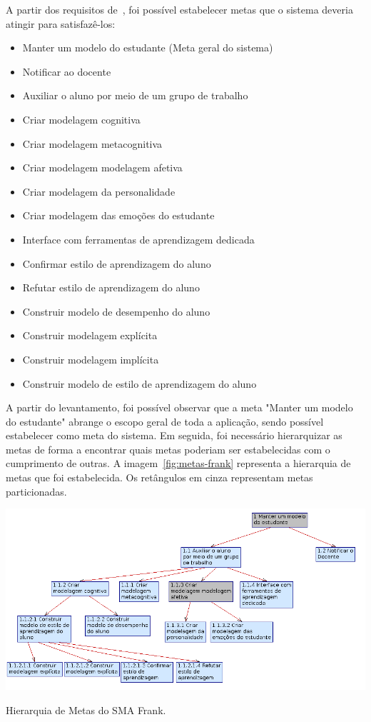 A partir dos requisitos de~\cite{editalFrank}, foi possível estabelecer metas que o sistema deveria atingir para satisfazê-los:

\begin{itemize}
	\item Manter um modelo do estudante (Meta geral do sistema)
	\item Notificar ao docente
	\item Auxiliar o aluno por meio de um grupo de trabalho
	\item Criar modelagem cognitiva
	\item Criar modelagem metacognitiva
	\item Criar modelagem modelagem afetiva
	\item Criar modelagem da personalidade
	\item Criar modelagem das emoções do estudante
	\item Interface com ferramentas de aprendizagem dedicada
	\item Confirmar estilo de aprendizagem do aluno
	\item Refutar estilo de aprendizagem do aluno
	\item Construir modelo de desempenho do aluno
	\item Construir modelagem explícita
	\item Construir modelagem implícita
	\item Construir modelo de estilo de aprendizagem do aluno
\end{itemize}

A partir do levantamento, foi possível observar que a meta "Manter um modelo do estudante" abrange o escopo geral de toda a aplicação, sendo possível estabelecer como meta do sistema. Em seguida, foi necessário hierarquizar as metas de forma a encontrar quais metas poderiam ser estabelecidas com o cumprimento de outras. A imagem~\ref{fig:metas-frank} representa a hierarquia de metas que foi estabelecida. Os retângulos em cinza representam metas particionadas.

\begin{table}
	\centering
	\includegraphics[scale=0.8]{images/metas-frank.png}
	\caption{Hierarquia de Metas do SMA Frank.}
	\label{fig:metas-frank}
\end{table}

